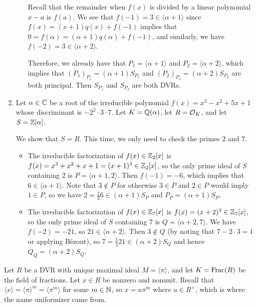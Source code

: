 \begin{enumerate}[(1)]
\begin{itemize}
        Recall that the remainder when $f(x)$ is divided by a linear 
        polynomial $x-a$ is $f(a)$. 
        We see that $f(-1) = 3 \in \langle \alpha + 1 \rangle$ since 
        $f(x) = (x+1)q(x) + f(-1)$ implies that $0 = f(\alpha) = 
        (\alpha+1)q(\alpha) + f(-1)$, and similarly, we have $f(-2) = 3 \in 
        \langle \alpha + 2 \rangle$. 
        
        Therefore, we already have that $P_1 = 
        \langle \alpha + 1 \rangle$ and $P_2 = \langle \alpha + 2 \rangle$, 
        which implies that $(P_1)_{P_1} = (\alpha + 1) S_{P_1}$ and 
        $(P_2)_{P_2} = (\alpha + 2) S_{P_2}$ are both principal. Then 
        $S_{P_1}$ and $S_{P_2}$ are both DVRs.

    \end{itemize}

    \item Let $\alpha \in \mathbb{C}$ be a root of the irreducible polynomial 
    $f(x) = x^3 - x^2 + 5x + 1$ whose discriminant is $-2^2 \cdot 3 \cdot 7$.
    Let $K = \mathbb{Q}(\alpha)$, let $R = {\cal O}_K$, and let $S = \mathbb{Z}[\alpha]$. 

    We show that $S = R$. This time, we only need to check the primes $2$ and $7$.
    \begin{itemize}
        \item The irreducible factorization of $f(x) \in \mathbb{Z}_2[x]$ is 
        $f(x) = x^3 + x^2 + x + 1 = (x+1)^3 \in \mathbb{Z}_2[x]$, so the only 
        prime ideal of $S$ containing $2$ is $P = \langle \alpha + 1, 2 \rangle$. 
        Then $f(-1) = -6$, which implies that $6 \in \langle \alpha + 1 \rangle$. 
        Note that $3 \notin P$ for otherwise $3 \in P$ and $2 \in P$ would imply 
        $1 \in P$, so we have $2 = \frac{1}{3} 6 \in (\alpha + 1) S_P$ and 
        $P_P = (\alpha + 1)S_P$. 
        
        \item The irreducible factorization of $f(x) \in \mathbb{Z}_7[x]$ is 
        $f(x) = (x+2)^3 \in \mathbb{Z}_7[x]$, so the only prime ideal of $S$ containing $7$ 
        is $Q = \langle \alpha + 2, 7 \rangle$. We have $f(-2) = -21$, so 
        $21 \in \langle \alpha + 2 \rangle$. Then $3 \notin Q$ (by noting that 
        $7 - 2 \cdot 3 = 1$ or applying B\'ezout), so $7 = \frac{1}{3} 21 
        \in (\alpha + 2) S_Q$ and hence $Q_Q = (\alpha + 2) S_Q$.
    \end{itemize}

\end{enumerate}

Let $R$ be a DVR with unique maximal ideal $M = \langle \pi \rangle$, 
and let $K = \operatorname{Frac}(R)$ be the field of fractions. Let $x \in R$ be nonzero 
and nonunit. Recall that $\langle x \rangle = \langle \pi \rangle^m = 
\langle \pi^m \rangle$ for some $m \in \mathbb{N}$, so $x = u\pi^m$ where 
$u \in R^\times$, which is where the name uniformizer came from. 

